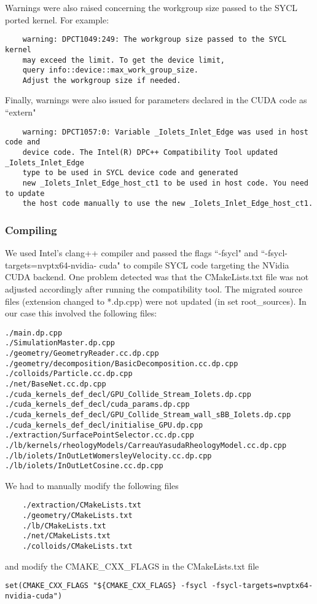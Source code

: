 \documentclass[../main]{subfiles}
\begin{document}
Warnings were also raised concerning the workgroup size passed to the SYCL ported kernel. For example:
\begin{verbatim}
    warning: DPCT1049:249: The workgroup size passed to the SYCL kernel 
    may exceed the limit. To get the device limit, 
    query info::device::max_work_group_size. 
    Adjust the workgroup size if needed.
\end{verbatim}

Finally, warnings were also issued for parameters declared in the CUDA code as ``extern"
\begin{verbatim}
    warning: DPCT1057:0: Variable _Iolets_Inlet_Edge was used in host code and 
    device code. The Intel(R) DPC++ Compatibility Tool updated _Iolets_Inlet_Edge 
    type to be used in SYCL device code and generated 
    new _Iolets_Inlet_Edge_host_ct1 to be used in host code. You need to update 
    the host code manually to use the new _Iolets_Inlet_Edge_host_ct1.
\end{verbatim}

\subsubsection{Compiling}
We used Intel’s clang++ compiler and passed the flags ``-fsycl" and ``-fsycl-targets=nvptx64-nvidia-
cuda" to compile SYCL code targeting the NVidia CUDA backend. 
One problem detected was that the CMakeLists.txt file was not adjusted accordingly after running the  compatibility tool. The migrated source files (extension changed to *.dp.cpp) were not updated (in set root\_sources). In our case this involved the following files:
\begin{verbatim}
./main.dp.cpp
./SimulationMaster.dp.cpp
./geometry/GeometryReader.cc.dp.cpp
./geometry/decomposition/BasicDecomposition.cc.dp.cpp
./colloids/Particle.cc.dp.cpp
./net/BaseNet.cc.dp.cpp
./cuda_kernels_def_decl/GPU_Collide_Stream_Iolets.dp.cpp
./cuda_kernels_def_decl/cuda_params.dp.cpp
./cuda_kernels_def_decl/GPU_Collide_Stream_wall_sBB_Iolets.dp.cpp
./cuda_kernels_def_decl/initialise_GPU.dp.cpp
./extraction/SurfacePointSelector.cc.dp.cpp
./lb/kernels/rheologyModels/CarreauYasudaRheologyModel.cc.dp.cpp
./lb/iolets/InOutLetWomersleyVelocity.cc.dp.cpp
./lb/iolets/InOutLetCosine.cc.dp.cpp
\end{verbatim}

We had to manually modify the following files
\begin{verbatim}
    ./extraction/CMakeLists.txt
    ./geometry/CMakeLists.txt
    ./lb/CMakeLists.txt
    ./net/CMakeLists.txt
    ./colloids/CMakeLists.txt
\end{verbatim}
and modify the CMAKE\_CXX\_FLAGS in the CMakeLists.txt file
\begin{verbatim}
set(CMAKE_CXX_FLAGS "${CMAKE_CXX_FLAGS} -fsycl -fsycl-targets=nvptx64-nvidia-cuda")
\end{verbatim}
\end{document}
